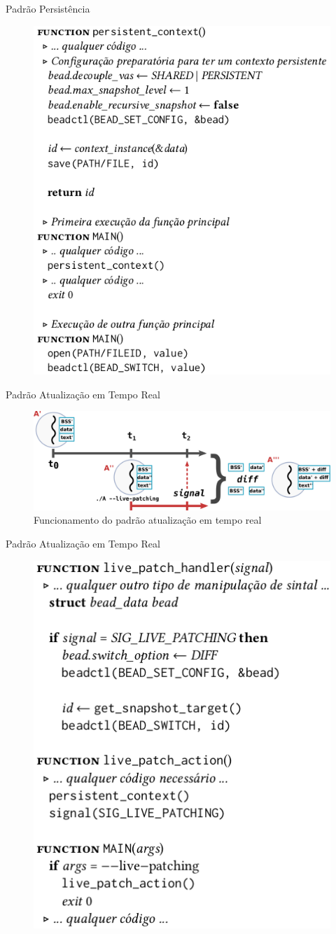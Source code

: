 \documentclass[xcolor={usenames,svgnames,dvipsnames},brazil,english,12pt,aspectratio=149]{beamer}
\begin{document}
\begin{frame}{Padrão Persistência}
  \begin{figure}[!h]
    \centering
    \includegraphics[width=.4\textwidth]{persistente}
  \end{figure}
\end{frame}

\begin{frame}{Padrão Atualização em Tempo Real}
  \begin{figure}[!h]
    \centering
    \includegraphics[width=\textwidth]{live-patching}
    \caption*{Funcionamento do padrão atualização em tempo real}
  \end{figure}
\end{frame}

\begin{frame}{Padrão Atualização em Tempo Real}
  \begin{figure}[!h]
    \centering
    \includegraphics[width=.4\textwidth]{tempoReal}
  \end{figure}
\end{frame}
\end{document}
